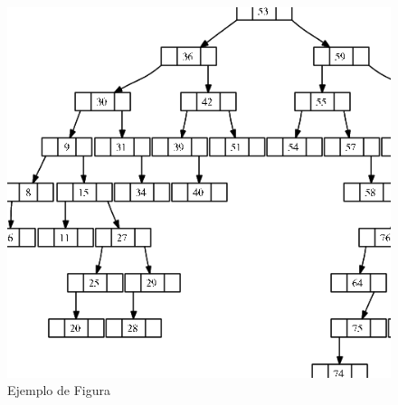 \begin{figure}[!htb]
   \centering
   \includegraphics[width=0.5\linewidth]{images/arbolbinario}
   \caption{Ejemplo de Figura}
   \label{}
\end{figure}


